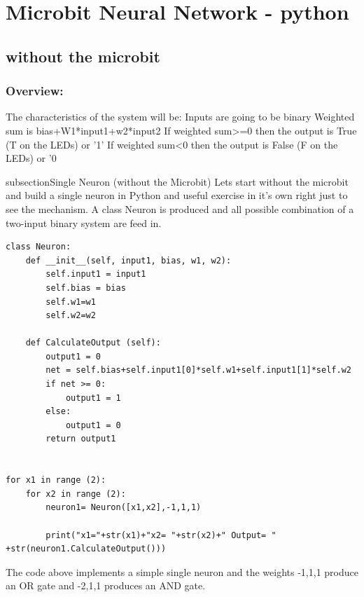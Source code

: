 \chapter{Microbit Neural Network - python}

\section{without the microbit}
\subsection{Overview:}
The characteristics of the system will be:
Inputs are going to be binary
Weighted sum is bias+W1*input1+w2*input2
If weighted sum>=0 then the output is True (T on the LEDs) or '1'
If weighted sum<0 then the output is False (F on the LEDs) or '0

subsection{Single Neuron (without the Microbit)}
Lets start without the microbit and build a single neuron in Python and useful exercise in it's own right just to see the mechanism. A class Neuron is produced and all possible combination of a two-input binary system are feed in. 
\begin{verbatim}
class Neuron:
    def __init__(self, input1, bias, w1, w2):
        self.input1 = input1
        self.bias = bias
        self.w1=w1
        self.w2=w2
    
    def CalculateOutput (self):
        output1 = 0
        net = self.bias+self.input1[0]*self.w1+self.input1[1]*self.w2
        if net >= 0:
            output1 = 1
        else:
            output1 = 0
        return output1


for x1 in range (2):
    for x2 in range (2):
        neuron1= Neuron([x1,x2],-1,1,1)

        print("x1="+str(x1)+"x2= "+str(x2)+" Output= " +str(neuron1.CalculateOutput()))
\end{verbatim}


The code above implements a simple single neuron and the weights -1,1,1 produce an OR gate and -2,1,1 produces an AND gate.

